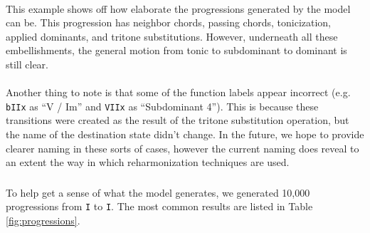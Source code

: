 \documentclass[]{article}
\begin{document}
\paragraph{} This example shows off how elaborate the progressions generated by the model can be.  This progression has neighbor chords, passing chords, tonicization, applied dominants, and tritone substitutions.  However, underneath all these embellishments, the general motion from tonic to subdominant to dominant is still clear.

\paragraph{} Another thing to note is that some of the function labels appear incorrect (e.g. \texttt{bIIx} as ``V / Im'' and \texttt{VIIx} as ``Subdominant 4'').  This is because these transitions were created as the result of the tritone substitution operation, but the name of the destination state didn't change.  In the future, we hope to provide clearer naming in these sorts of cases, however the current naming does reveal to an extent the way in which reharmonization techniques are used.

\subsubsection{} To help get a sense of what the model generates, we generated 10,000 progressions from \texttt{I} to \texttt{I}.  The most common results are listed in Table \ref{fig:progressions}.
\end{document}
